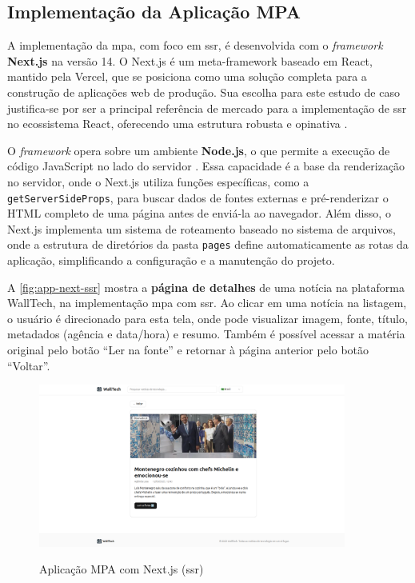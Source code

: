 \subsection{Implementação da Aplicação MPA}
\label{ssec:implementacao_mpa}

A implementação da \acrfull{mpa}, com foco em \acrfull{ssr}, é desenvolvida com o \emph{framework} \textbf{Next.js} na versão 14. O Next.js é um meta-framework baseado em React, mantido pela Vercel, que se posiciona como uma solução completa para a construção de aplicações web de produção. Sua escolha para este estudo de caso justifica-se por ser a principal referência de mercado para a implementação de \acrshort{ssr} no ecossistema React, oferecendo uma estrutura robusta e opinativa \cite{nextjs2024}.

O \emph{framework} opera sobre um ambiente \textbf{Node.js}, o que permite a execução de código JavaScript no lado do servidor \cite{nodejs2025}. Essa capacidade é a base da renderização no servidor, onde o Next.js utiliza funções específicas, como a \texttt{getServerSideProps}, para buscar dados de fontes externas e pré-renderizar o HTML completo de uma página antes de enviá-la ao navegador. Além disso, o Next.js implementa um sistema de roteamento baseado no sistema de arquivos, onde a estrutura de diretórios da pasta \texttt{pages} define automaticamente as rotas da aplicação, simplificando a configuração e a manutenção do projeto.


A \autoref{fig:app-next-ssr} mostra a \textbf{página de detalhes} de uma notícia na plataforma WallTech, na implementação \acrshort{mpa} com \acrshort{ssr}. Ao clicar em uma notícia na listagem, o usuário é direcionado para esta tela, onde pode visualizar imagem, fonte, título, metadados (agência e data/hora) e resumo. Também é possível acessar a matéria original pelo botão “Ler na fonte” e retornar à página anterior pelo botão “Voltar”.

\begin{figure}[H]
  \centering
  \caption{Aplicação MPA com Next.js (\acrshort{ssr})}
  \includegraphics[width=0.9\textwidth]{media/app_next_ssr.png}
  \label{fig:app-next-ssr}
\end{figure}



